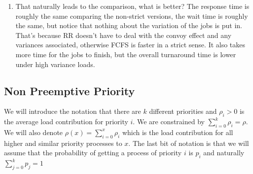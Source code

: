 \begin{enumerate}
\item That naturally leads to the comparison, what is better?
  The response time is roughly the same comparing the non-strict versions, the wait time is roughly the same, but notice that nothing about the variation of the jobs is put in.
  That's because RR doesn't have to deal with the convoy effect and any variances associated, otherwise FCFS is faster in a strict sense.
  It also takes more time for the jobs to finish, but the overall turnaround time is lower under high variance loads.
\end{enumerate}

\subsection{Non Preemptive Priority}

We will introduce the notation that there are $k$ different priorities and $\rho_i > 0$ is the average load contribution for priority $i$. We are constrained by $\sum\limits_{i=0}^k \rho_i = \rho$.
We will also denote $\rho(x) = \sum\limits_{i=0}^x \rho_i$ which is the load contribution for all higher and similar priority processes to $x$.
The last bit of notation is that we will assume that the probability of getting a process of priority $i$ is $p_i$ and naturally $\sum\limits_{j=0}^k p_j = 1$
 

